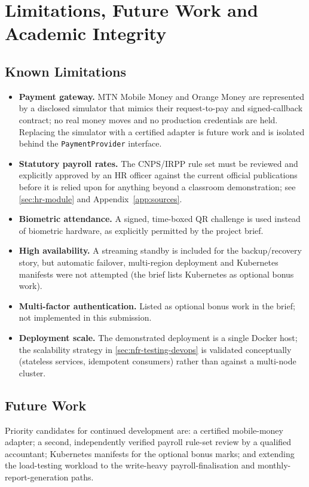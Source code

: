\section{Limitations, Future Work and Academic Integrity}
\label{sec:limitations}

\subsection{Known Limitations}
\begin{itemize}[leftmargin=1.4em]
  \item \textbf{Payment gateway.} MTN Mobile Money and Orange Money are
    represented by a disclosed simulator that mimics their request-to-pay and
    signed-callback contract; no real money moves and no production
    credentials are held. Replacing the simulator with a certified adapter is
    future work and is isolated behind the \texttt{PaymentProvider} interface.
  \item \textbf{Statutory payroll rates.} The CNPS/IRPP rule set must be
    reviewed and explicitly approved by an HR officer against the current
    official publications before it is relied upon for anything beyond a
    classroom demonstration; see \cref{sec:hr-module} and
    Appendix~\ref{app:sources}.
  \item \textbf{Biometric attendance.} A signed, time-boxed QR challenge is
    used instead of biometric hardware, as explicitly permitted by the
    project brief.
  \item \textbf{High availability.} A streaming standby is included for the
    backup/recovery story, but automatic failover, multi-region deployment
    and Kubernetes manifests were not attempted (the brief lists Kubernetes as
    optional bonus work).
  \item \textbf{Multi-factor authentication.} Listed as optional bonus work in
    the brief; not implemented in this submission.
  \item \textbf{Deployment scale.} The demonstrated deployment is a single
    Docker host; the scalability strategy in
    \cref{sec:nfr-testing-devops} is validated conceptually (stateless
    services, idempotent consumers) rather than against a multi-node cluster.
\end{itemize}

\subsection{Future Work}
Priority candidates for continued development are: a certified mobile-money
adapter; a second, independently verified payroll rule-set review by a
qualified accountant; Kubernetes manifests for the optional bonus marks;
and extending the load-testing workload to the write-heavy payroll-finalisation
and monthly-report-generation paths.

